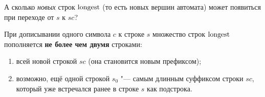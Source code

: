 А сколько \emph{новых} строк $\operatorname{longest}$ (то есть новых вершин автомата) может появиться при переходе от $s$ к $sc$?

\begin{lemma}\label{lem:sa_at_most_2}
    При дописывании одного символа $c$ к строке $s$ множество строк $\operatorname{longest}$ пополняется \textbf{не более чем двумя} строками:
    \begin{enumerate}
        \item всей новой строкой $sc$ (она становится новым префиксом);
        \item возможно, ещё одной строкой $s_0$ "--- самым длинным суффиксом строки $sc$, который уже встречался ранее в строке $s$ как подстрока.
    \end{enumerate}
\end{lemma}

